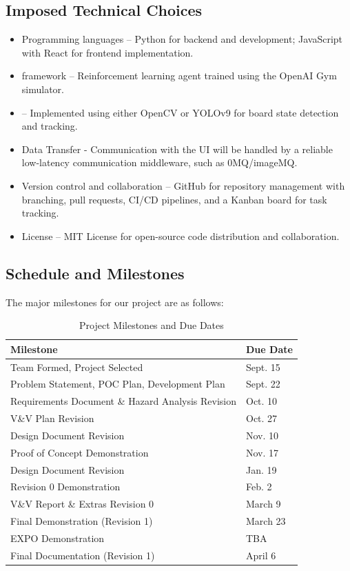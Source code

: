 \documentclass{article}
\begin{document}
\subsection{Imposed Technical Choices}\label{subsec:technicalchoices}
\begin{itemize}
    \item {Programming languages} – Python for backend and \AI{} development; JavaScript with React for frontend implementation.
    \item {\AI{} framework} – Reinforcement learning agent trained using the OpenAI Gym \emph{\Catan{}} simulator.
    \item {\CV{}} – Implemented using either OpenCV or YOLOv9 for board state detection and tracking.
    \item {Data Transfer} - Communication with the UI will be handled by a reliable low-latency communication middleware, such as 0MQ/imageMQ.

    \item {Version control and collaboration} – GitHub for repository management with branching, pull requests, CI/CD pipelines, and a Kanban board for task tracking.
    \item {License} – MIT License for open-source code distribution and collaboration.
\end{itemize}

\subsection{Schedule and Milestones}\label{subsec:schedule}
\medskip
The major milestones for our project are as follows:
\begin{table}[H]
  \centering
  \begin{tabular}{|l|l|}
  \hline
  \textbf{Milestone} & \textbf{Due Date} \\ \hline
  Team Formed, Project Selected & Sept. 15 \\ \hline
  Problem Statement, POC Plan, Development Plan & Sept. 22 \\ \hline
  Requirements Document \& Hazard Analysis Revision & Oct. 10 \\ \hline
  V\&V Plan Revision & Oct. 27 \\ \hline
  Design Document Revision & Nov. 10 \\ \hline
  Proof of Concept Demonstration & Nov. 17 \\ \hline
  Design Document Revision & Jan. 19 \\ \hline
  Revision 0 Demonstration & Feb. 2 \\ \hline
  V\&V Report \& Extras Revision 0 & March 9 \\ \hline
  Final Demonstration (Revision 1) & March 23 \\ \hline
  EXPO Demonstration & TBA \\ \hline
  Final Documentation (Revision 1) & April 6 \\ \hline
  
  \end{tabular}
  \caption{Project Milestones and Due Dates}
  \label{tab:project-milestones}
  \end{table}
\end{document}
